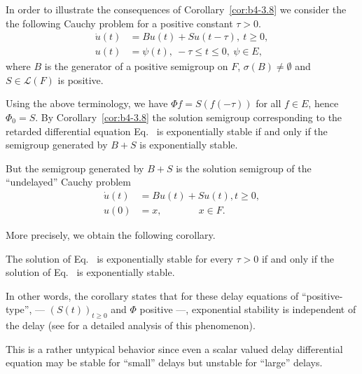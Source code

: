 \begin{example}\label{ex:b4-3.10}
	In order to illustrate the consequences of Corollary~\ref{cor:b4-3.8} we consider the the following Cauchy problem for a positive constant  $\tau > 0$.
	\begin{equation}\label{eq:b4-3.7}
		\begin{aligned}
		\dot{u}(t) &= Bu(t) + Su(t-\tau) , \  t \geq 0 ,\\
		u(t) &= \psi(t) , \  -\tau \leq t \leq 0  , \ \psi \in E ,
		\end{aligned}
	\end{equation}
	where $B$ is the generator of a positive semigroup on $F$, $\sigma(B) \neq \emptyset$ and $S \in \mathcal{L}(F)$ is positive.
	
	Using the above terminology, we have $\Phi f = S(f(-\tau))$ for all $f \in E$, hence $\Phi_{0} = S$. 
	By Corollary~\ref{cor:b4-3.8} the solution semigroup corresponding to the retarded differential equation Eq.~ is exponentially stable if and only if the semigroup generated by $B + S$ is exponentially stable.
	
	But the semigroup generated by $B + S$ is the solution semigroup of the \enquote{undelayed} Cauchy problem
	\begin{equation}\label{eq:b4-3.8}
	\begin{aligned}
		\dot{u}(t) &= Bu(t) + Su(t) , t \geq 0 ,\\
		u(0) &= x , \quad\quad\quad\;\;\, x \in F.
	\end{aligned}
	\end{equation}
\end{example}
More precisely, we obtain the following corollary.
\begin{corollary*}
    The solution of Eq.~ is exponentially stable for every $\tau > 0$ if and only if the solution of Eq.~ is exponentially stable.
\end{corollary*}
In other words, the corollary states that for these delay equations of \enquote{positive-type}, 
--- $(S(t))_{t\geq0}$ and $\Phi$ positive ---, 
exponential stability is independent of the delay (see \textcite{kerscher:1986} for a detailed analysis of this phenomenon).
	
This is a rather untypical behavior since even a scalar valued delay differential equation may be stable for \enquote{small} delays but unstable for \enquote{large} delays.
	
